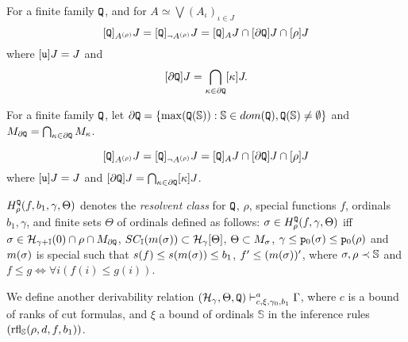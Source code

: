 \documentclass{article}
\newcommand{\mS}{\mathbb{S}}
\newcommand{\mI}{\mathbb{I}}
\begin{document}
\bdf
{\rm
For a finite family ${\tt Q}$, 
and for $A\simeq\bigvee(A_{\iota})_{\iota\in J}$
\[
[{\tt Q}]_{A^{(\rho)}}J=[{\tt Q}]_{\lnot A^{(\rho)}}J=[{\tt Q}]_{A}J\cap [\partial{\tt Q}]J\cap [\rho]J
\]
where $[{\tt u}]J=J$ and
\[
[\partial{\tt Q}]J=\bigcap_{\kappa\in\partial{\tt Q}} [\kappa]J
.\]
}
\edf

\bdf
{\rm
\benu


\item
For a finite family ${\tt Q}$, let
$
\partial{\tt Q}=\{\max({\tt Q}(\mS)) : \mS\in dom({\tt Q}), {\tt Q}(\mS)\neq\emptyset\}
$ and
$M_{\partial{\tt Q}}=\bigcap_{\kappa\in\partial{\tt Q}}M_{\kappa}$.

\item
\[
[{\tt Q}]_{A^{(\rho)}}J=[{\tt Q}]_{\lnot A^{(\rho)}}J=[{\tt Q}]_{A}J\cap [\partial{\tt Q}]J\cap [\rho]J
\]
where 
$[{\tt u}]J=J$ and
$[\partial{\tt Q}]J=\bigcap_{\kappa\in\partial{\tt Q}} [\kappa]J$.


\eenu
}
\edf



\bdf\label{df:resolvent}
{\rm
$H_{\rho}^{{\tt Q}}(f,b_{1},\gamma,\Theta)$
 denotes the \textit{resolvent class} for ${\tt Q}$, $\rho$,
special functions $f$,
ordinals $b_{1},\gamma$, and
finite sets $\Theta$ of ordinals defined as follows:
$\sigma\in H_{\rho}^{{\tt Q}}(f,\gamma,\Theta)$ iff 
$\sig\in\calh_{\gam+\mI}(0)\cap\rho\cap M_{\partial{\tt Q}}$,
$SC_{\mI}(m(\sig))\subset\calh_{\gam}[\Tht]$,
$\Theta
\subset M_{\sigma}$,
$\gamma\leq{\tt p}_{0}(\sigma)\leq{\tt p}_{0}(\rho)$ and
$m(\sigma)$ is special such that 
$s(f)\leq s(m(\sigma))\leq b_{1}$,
 $f^{\prime} \leq (m(\sigma))^{\prime}$,
where $\sig, \rho\prec\mS$ and
$f\leq g\Leftrightarrow
\forall i(f(i)\leq g(i))$.
}
\edf



We define another derivability  relation $(\mathcal{H}_{\gamma},\Theta,{\tt Q}
)\vdash^{a}_{c,\xi,\gamma_{0},b_{1}}\Gamma$, 
where
$c$ is a bound of ranks of cut formulas,
and $\xi$ a bound of ordinals $\mS$ in the inference rules $({\rm rfl}_{\mS}(\rho,d,f,b_{1}))$.
\end{document}
